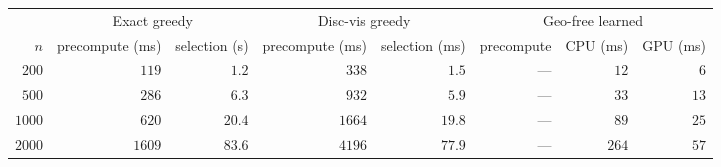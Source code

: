 \begin{tabular}{rrrrrrrr}
  \toprule
   & \multicolumn{2}{c}{Exact greedy} & \multicolumn{2}{c}{Disc-vis greedy} & \multicolumn{3}{c}{Geo-free learned} \\
  \cmidrule(lr){2-3}\cmidrule(lr){4-5}\cmidrule(lr){6-8}
  $n$ & precompute (ms) & selection (s) & precompute (ms) & selection (ms) & precompute & CPU (ms) & GPU (ms) \\
  \midrule
  $200$  & $119$  & $1.2$  & $338$  & $1.5$  & --- & $12$  & $6$  \\
  $500$  & $286$  & $6.3$  & $932$  & $5.9$  & --- & $33$  & $13$ \\
  $1000$ & $620$  & $20.4$ & $1664$ & $19.8$ & --- & $89$  & $25$ \\
  $2000$ & $1609$ & $83.6$ & $4196$ & $77.9$ & --- & $264$ & $57$ \\
  \bottomrule
\end{tabular}
